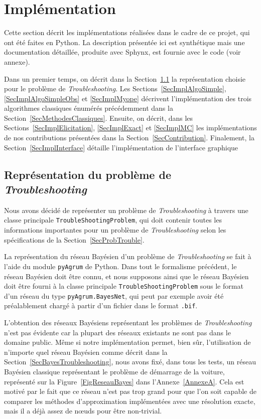 \documentclass[a4paper,11pt]{article}
\theoremstyle{plain}
\theoremstyle{definition}
\begin{document}
\section{Implémentation}
\label{SecImplementation}

Cette section décrit les implémentations réalisées dans le cadre de ce projet, qui ont été faites en Python. La description présentée ici est synthétique mais une documentation détaillée, produite avec Sphynx, est fournie avec le code (voir annexe).

Dans un premier temps, on décrit dans la Section~\ref{SecImplRepresentation} la représentation choisie pour le problème de \emph{Troubleshooting}. Les Sections~\ref{SecImplAlgoSimple}, \ref{SecImplAlgoSimpleObs} et \ref{SecImplMyope} décrivent l'implémentation des trois algorithmes classiques énumérés précédemment dans la Section~\ref{SecMethodesClassiques}. Ensuite, on décrit, dans les Sections~\ref{SecImplElicitation}, \ref{SecImplExact} et \ref{SecImplMC} les implémentations de nos contributions présentées dans la Section~\ref{SecContribution}. Finalement, la Section~\ref{SecImplInterface} détaille l'implémentation de l'interface graphique

\subsection{Représentation du problème de \emph{Troubleshooting}}
\label{SecImplRepresentation}

Nous avons décidé de représenter un problème de \emph{Troubleshooting} à travers une classe principale \texttt{TroubleShootingProblem}, qui doit contenir toutes les informations importantes pour un problème de \emph{Troubleshooting} selon les spécifications de la Section~\ref{SecProbTrouble}.

La représentation du réseau Bayésien d'un problème de \emph{Troubleshooting} se fait à l'aide du module \texttt{pyAgrum} de Python. Dans tout le formalisme précédent, le réseau Bayésien doit être connu, et nous supposons ainsi que le réseau Bayésien doit être fourni à la classe principale \texttt{TroubleShootingProblem} sous le format d'un réseau du type \texttt{pyAgrum.BayesNet}, qui peut par exemple avoir été préalablement chargé à partir d'un fichier dans le format \texttt{.bif}.

L'obtention des réseaux Bayésiens représentant les problèmes de \emph{Troubleshooting} n'est pas évidente car la plupart des réseaux existants ne sont pas dans le domaine public. Même si notre implémentation permet, bien sûr, l'utilisation de n'importe quel réseau Bayésien comme décrit dans la Section~\ref{SecBayesTroubleshooting}, nous avons fixé, dans tous les tests, un réseau Bayésien classique représentant le problème de démarrage de la voiture, représenté sur la Figure~\ref{FigReseauBayes} dans l'Annexe~\ref{AnnexeA}. Cela est motivé par le fait que ce réseau n'est pas trop grand pour que l'on soit capable de comparer les méthodes d'approximation implémentées avec une résolution exacte, mais il a déjà assez de nœuds pour être non-trivial.
\end{document}
